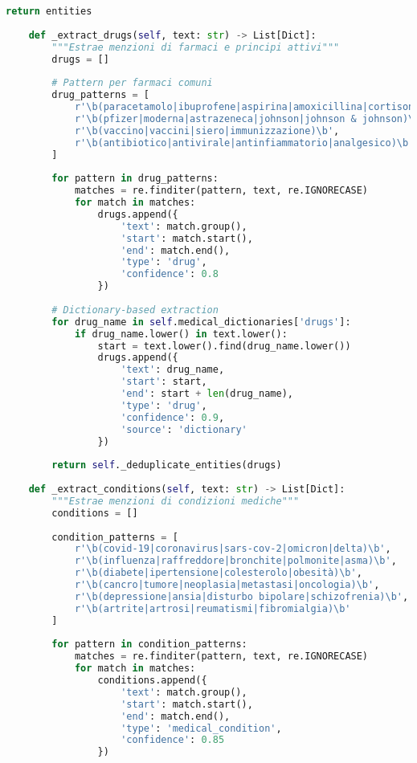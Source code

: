 \documentclass[12pt,a4paper]{report}
\begin{document}
\begin{lstlisting}[language=Python, caption=Medical Entity Extractor]
        return entities
    
    def _extract_drugs(self, text: str) -> List[Dict]:
        """Estrae menzioni di farmaci e principi attivi"""
        drugs = []
        
        # Pattern per farmaci comuni
        drug_patterns = [
            r'\b(paracetamolo|ibuprofene|aspirina|amoxicillina|cortisone)\b',
            r'\b(pfizer|moderna|astrazeneca|johnson|johnson & johnson)\b',
            r'\b(vaccino|vaccini|siero|immunizzazione)\b',
            r'\b(antibiotico|antivirale|antinfiammatorio|analgesico)\b'
        ]
        
        for pattern in drug_patterns:
            matches = re.finditer(pattern, text, re.IGNORECASE)
            for match in matches:
                drugs.append({
                    'text': match.group(),
                    'start': match.start(),
                    'end': match.end(),
                    'type': 'drug',
                    'confidence': 0.8
                })
        
        # Dictionary-based extraction
        for drug_name in self.medical_dictionaries['drugs']:
            if drug_name.lower() in text.lower():
                start = text.lower().find(drug_name.lower())
                drugs.append({
                    'text': drug_name,
                    'start': start,
                    'end': start + len(drug_name),
                    'type': 'drug',
                    'confidence': 0.9,
                    'source': 'dictionary'
                })
        
        return self._deduplicate_entities(drugs)
    
    def _extract_conditions(self, text: str) -> List[Dict]:
        """Estrae menzioni di condizioni mediche"""
        conditions = []
        
        condition_patterns = [
            r'\b(covid-19|coronavirus|sars-cov-2|omicron|delta)\b',
            r'\b(influenza|raffreddore|bronchite|polmonite|asma)\b',
            r'\b(diabete|ipertensione|colesterolo|obesità)\b',
            r'\b(cancro|tumore|neoplasia|metastasi|oncologia)\b',
            r'\b(depressione|ansia|disturbo bipolare|schizofrenia)\b',
            r'\b(artrite|artrosi|reumatismi|fibromialgia)\b'
        ]
        
        for pattern in condition_patterns:
            matches = re.finditer(pattern, text, re.IGNORECASE)
            for match in matches:
                conditions.append({
                    'text': match.group(),
                    'start': match.start(),
                    'end': match.end(),
                    'type': 'medical_condition',
                    'confidence': 0.85
                })
        

\end{lstlisting}
\end{document}
